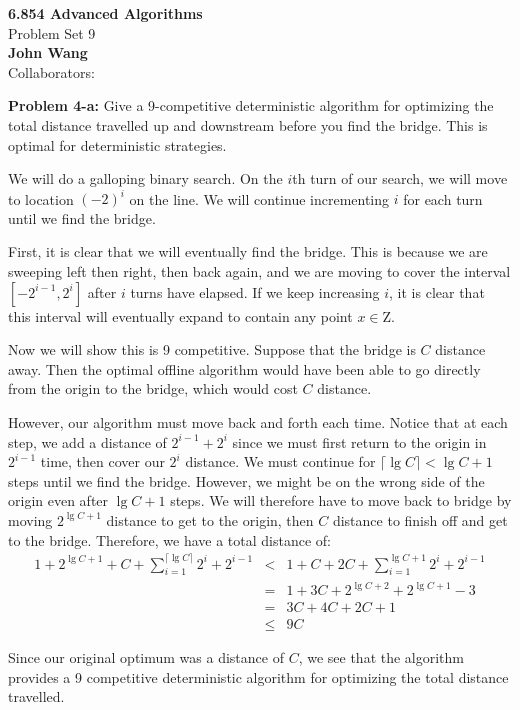 \documentclass[psamsfonts]{amsart}
\newenvironment{sol}{\vspace{0.25cm}{\large \bfseries Solution:}}{\qedsymbol}
\newenvironment{prob}[1]{\begin{framed}{\large \bfseries Problem #1:}}{\end{framed}}
\newcommand{\makenewtitle}{
    \begin{center}
    {\huge \bfseries 6.854 Advanced Algorithms} \\
    Problem Set 9\\
    \vspace{0.25cm}
    {\bfseries John Wang} \\
    Collaborators:  
    \end{center}
    \vspace{0.5cm}
}
\begin{document}
\newpage
\makenewtitle

\begin{prob}{4-a}
Give a 9-competitive deterministic algorithm for optimizing the total distance travelled up and downstream before you find the bridge. This is optimal for deterministic strategies.
\end{prob}

\begin{sol}
We will do a galloping binary search. On the $i$th turn of our search, we will move to location $(-2)^{i}$ on the line. We will continue incrementing $i$ for each turn until we find the bridge. 

First, it is clear that we will eventually find the bridge. This is because we are sweeping left then right, then back again, and we are moving to cover the interval $[-2^{i-1}, 2^{i}]$ after $i$ turns have elapsed. If we keep increasing $i$, it is clear that this interval will eventually expand to contain any point $x \in \mathrm{Z}$. 

Now we will show this is 9 competitive. Suppose that the bridge is $C$ distance away. Then the optimal offline algorithm would have been able to go directly from the origin to the bridge, which would cost $C$ distance. 

However, our algorithm must move back and forth each time. Notice that at each step, we add a distance of $2^{i-1} + 2^i$ since we must first return to the origin in $2^{i-1}$ time, then cover our $2^i$ distance. We must continue for $\lceil \lg C \rceil < \lg C + 1$ steps until we find the bridge. However, we might be on the wrong side of the origin even after $\lg C + 1$ steps. We will therefore have to move back to bridge by moving $2^{\lg C + 1}$ distance to get to the origin, then $C$ distance to finish off and get to the bridge. Therefore, we have a total distance of:
\begin{eqnarray}
1 + 2^{\lg C + 1} + C + \sum_{i=1}^{\lceil \lg C \rceil} 2^{i} + 2^{i-1} &<& 1 + C + 2C + \sum_{i=1}^{\lg C + 1} 2^i + 2^{i-1} \\
&=& 1 + 3C + 2^{\lg C + 2} + 2^{\lg C + 1} - 3 \\
&=& 3C + 4C + 2C + 1 \\
&\leq& 9C
\end{eqnarray}

Since our original optimum was a distance of $C$, we see that the algorithm provides a 9 competitive deterministic algorithm for optimizing the total distance travelled.
\end{sol}
\end{document}

